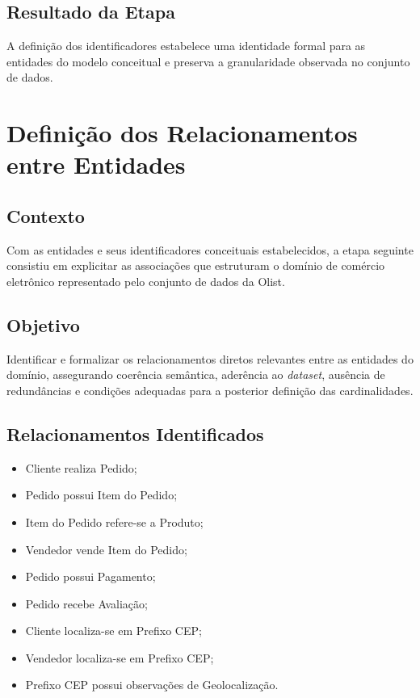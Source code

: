 \documentclass[12pt,a4paper]{article}
\begin{document}
	\subsection{Resultado da Etapa}
	
	A definição dos identificadores estabelece uma identidade formal para as
	entidades do modelo conceitual e preserva a granularidade observada no
	conjunto de dados.
	
	\section{Definição dos Relacionamentos entre Entidades}
	
	\subsection{Contexto}
	
	Com as entidades e seus identificadores conceituais estabelecidos, a etapa
	seguinte consistiu em explicitar as associações que estruturam o domínio de
	comércio eletrônico representado pelo conjunto de dados da Olist.
	
	\subsection{Objetivo}
	
	Identificar e formalizar os relacionamentos diretos relevantes entre as
	entidades do domínio, assegurando coerência semântica, aderência ao
	\textit{dataset}, ausência de redundâncias e condições adequadas para a
	posterior definição das cardinalidades.
	
	\subsection{Relacionamentos Identificados}
	
	\begin{itemize}[leftmargin=1.2cm]
		\item Cliente realiza Pedido;
		\item Pedido possui Item do Pedido;
		\item Item do Pedido refere-se a Produto;
		\item Vendedor vende Item do Pedido;
		\item Pedido possui Pagamento;
		\item Pedido recebe Avaliação;
		\item Cliente localiza-se em Prefixo CEP;
		\item Vendedor localiza-se em Prefixo CEP;
		\item Prefixo CEP possui observações de Geolocalização.
	\end{itemize}
	
\end{document}
